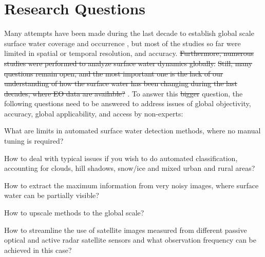 

\section{Research Questions}

Many attempts have been made during the last decade to establish global scale surface water coverage and occurrence , but most of the studies so far were limited in spatial or temporal resolution, and accuracy. \st{Furthermore, numerous studies were performed to analyze surface water dynamics globally.} \st{ Still, many questions remain open, and the most important one is the lack of our understanding of how the surface water has been changing during the last decades, where EO data are available? }.  To answer this \st{bigger} question, the following questions need to be answered to address issues of global objectivity, accuracy, global applicability, and access by non-experts: 

What are limits in automated surface water detection methods, where no manual tuning is required?

How to deal with typical issues if you wish to do automated classification, accounting for clouds, hill shadows, snow/ice and mixed urban and rural areas?

How to extract the maximum information from very noisy images, where surface water can be partially visible?

How to upscale methods to the global scale?

How to streamline the use of satellite images measured from different passive optical and active radar satellite sensors and what observation frequency can be achieved in this case? 

